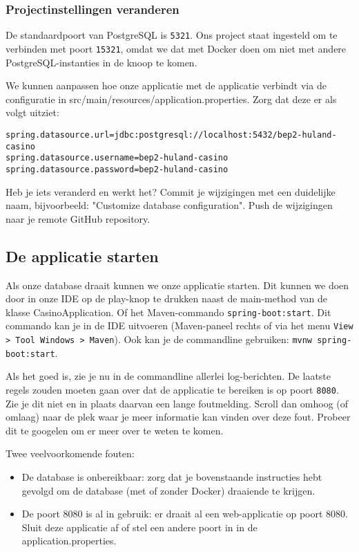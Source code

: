 \subsubsection{Projectinstellingen veranderen}
De standaardpoort van PostgreSQL is \texttt{5321}. 
Ons project staat ingesteld om te verbinden met poort \texttt{15321}, omdat we 
dat met Docker doen om niet met andere PostgreSQL-instanties in de knoop te komen.

We kunnen aanpassen hoe onze applicatie met de applicatie verbindt via 
de configuratie in src/main/resources/application.properties.
Zorg dat deze er als volgt uitziet:
\begin{verbatim}
spring.datasource.url=jdbc:postgresql://localhost:5432/bep2-huland-casino
spring.datasource.username=bep2-huland-casino
spring.datasource.password=bep2-huland-casino
\end{verbatim}

Heb je iets veranderd en werkt het? 
Commit je wijzigingen met een duidelijke naam, 
bijvoorbeeld: "Customize database configuration". 
Push de wijzigingen naar je remote GitHub repository.

\subsection{De applicatie starten}
Als onze database draait kunnen we onze applicatie starten.
Dit kunnen we doen door in onze IDE op de play-knop te drukken naast de main-method 
van de klasse CasinoApplication. Of het Maven-commando \texttt{spring-boot:start}.
Dit commando kan je in de IDE uitvoeren (Maven-paneel rechts of via het menu \texttt{View > Tool Windows > Maven}). 
Ook kan je de commandline gebruiken: \texttt{mvnw spring-boot:start}.

Als het goed is, zie je nu in de commandline allerlei log-berichten. De laatste regels 
zouden moeten gaan over dat de applicatie te bereiken is op poort \texttt{8080}.
Zie je dit niet en in plaats daarvan een lange foutmelding. Scroll dan omhoog (of omlaag)
naar de plek waar je meer informatie kan vinden over deze fout. Probeer dit te googelen 
om er meer over te weten te komen. 

Twee veelvoorkomende fouten:
\begin{itemize}
    \item De database is onbereikbaar: zorg dat je bovenstaande instructies hebt gevolgd om de database (met of zonder Docker)
    draaiende te krijgen.
    \item De poort 8080 is al in gebruik: er draait al een web-applicatie op poort 8080. 
    Sluit deze applicatie af of stel een andere poort in in de application.properties.
\end{itemize}

